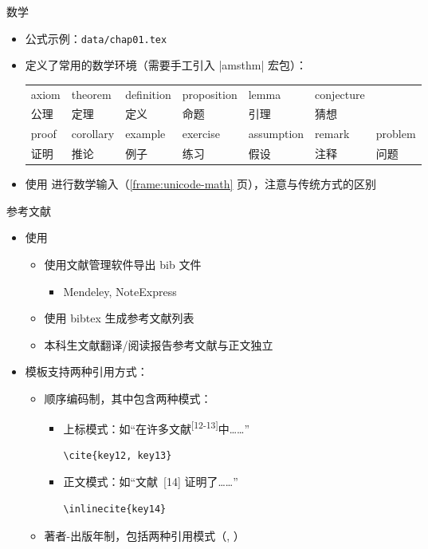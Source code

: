 \begin{frame}[fragile]{数学}
  \begin{itemize}
    \item 公式示例：\nolinkurl{data/chap01.tex}
    \item \ThuThesis{} 定义了常用的数学环境（需要手工引入 |amsthm| 宏包）：
      \begin{table}[h]
        \centering
        \footnotesize
\begin{tabular}{*{7}{l}}\toprule
  axiom & theorem & definition & proposition & lemma & conjecture &\\
  公理 & 定理 & 定义 & 命题 & 引理 & 猜想 &\\\midrule
  proof & corollary & example & exercise & assumption & remark & problem \\
  证明 & 推论 & 例子& 练习 & 假设 & 注释 & 问题\\\bottomrule
\end{tabular}
      \end{table}
      \item \ThuThesis{} 使用  进行数学输入（\ref{frame:unicode-math} 页），注意与传统方式的区别
  \end{itemize}
\end{frame}

\begin{frame}[fragile]{参考文献}
  \begin{itemize}
    \item 使用 \BibTeX
      \begin{itemize}
        \item 使用文献管理软件导出 bib 文件
          \begin{itemize}
            \item Mendeley, NoteExpress
          \end{itemize}
        \item 使用 bibtex 生成参考文献列表
        \item 本科生文献翻译/阅读报告参考文献与正文独立
      \end{itemize}
    \item 模板支持两种引用方式：
      \begin{itemize}
        \item 顺序编码制，其中包含两种模式：
        \begin{itemize}
          \item 上标模式：如“在许多文献\textsuperscript{[12-13]}中……”
          \begin{lstlisting}[basicstyle=\ttfamily]
    \cite{key12, key13}
          \end{lstlisting}
        \item 正文模式：如“文献~[14] 证明了……”
          \begin{lstlisting}[basicstyle=\ttfamily]
    \inlinecite{key14}
          \end{lstlisting}
        \end{itemize}
        \item 著者-出版年制，包括两种引用模式（, ）
      \end{itemize}
    \end{itemize}
\end{frame}


